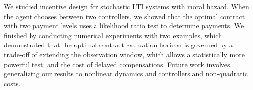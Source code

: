 \documentclass[letterpaper, 10 pt, conference]{ieeeconf}  %
\begin{document}

We studied incentive design for stochastic LTI systems with moral hazard. When the agent chooses between two controllers, we showed that the optimal contract with two payment levels uses a likelihood ratio test to determine payments. We finished by conducting numerical experiments with two examples, which demonstrated that the optimal contract evaluation horizon is governed by a trade-off of extending the observation window, which allows a statistically more powerful test, and the cost of delayed compensations. Future work involves generalizing our results to nonlinear dynamics and controllers and non-quadratic costs.%



\end{document}
